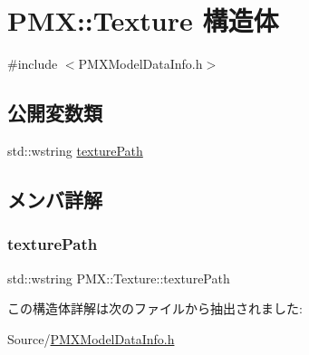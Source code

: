 \hypertarget{struct_p_m_x_1_1_texture}{}\section{P\+MX\+:\+:Texture 構造体}
\label{struct_p_m_x_1_1_texture}


{\ttfamily \#include $<$P\+M\+X\+Model\+Data\+Info.\+h$>$}

\subsection*{公開変数類}
\begin{DoxyCompactItemize}
\item 
std\+::wstring \mbox{\hyperlink{struct_p_m_x_1_1_texture_a64cf8591bd53dda79af0def55d26e760}{texture\+Path}}
\end{DoxyCompactItemize}


\subsection{メンバ詳解}
\mbox{\label{struct_p_m_x_1_1_texture_a64cf8591bd53dda79af0def55d26e760}} 
\subsubsection{\texorpdfstring{texture\+Path}{texturePath}}
{\footnotesize\ttfamily std\+::wstring P\+M\+X\+::\+Texture\+::texture\+Path}



この構造体詳解は次のファイルから抽出されました\+:\begin{DoxyCompactItemize}
\item 
Source/\mbox{\hyperlink{_p_m_x_model_data_info_8h}{P\+M\+X\+Model\+Data\+Info.\+h}}\end{DoxyCompactItemize}
